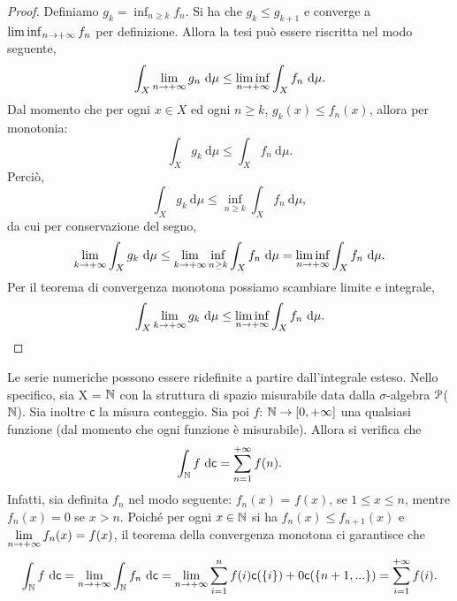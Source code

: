 \documentclass[Completo.tex]{subfiles}
\begin{document}
\begin{proof}
	Definiamo $g_k = \inf_{n \geq k} f_n$. Si ha che $g_k \leq g_{k+1}$ e converge a $\liminf_{n \rightarrow +\infty} f_n$ per definizione. Allora la tesi può essere riscritta nel modo seguente,
	\begin{equation*}
	\int_X \lim_{n \ra +\infty} g_n \ \mathrm{d}\mu \leq \liminf_{n \ra +\infty} \int_X f_n \ \mathrm{d}\mu.
	\end{equation*}
	Dal momento che per ogni $x \in X$ ed ogni $n \geq k$, $g_k(x) \leq f_n(x)$, allora per monotonia:
	\begin{equation*}
	\int_X g_k \ \mathrm{d}\mu \leq \int_X f_n \ \mathrm{d}\mu.
	\end{equation*}
	Perciò,
	\begin{equation*}
	\int_X g_k \ \mathrm{d}\mu \leq \inf_{n \geq k} \int_X f_n \ \mathrm{d}\mu,
	\end{equation*}
	da cui per conservazione del segno,
	\begin{equation*}
	\lim_{k \rightarrow +\infty} \int_X g_k \ \mathrm{d}\mu \leq \lim_{k \rightarrow +\infty} \inf_{n \geq k} \int_X f_n \ \mathrm{d}\mu = \liminf_{n \rightarrow +\infty} \int_X f_n \ \mathrm{d}\mu.
	\end{equation*}
	Per il teorema di convergenza monotona possiamo scambiare limite e integrale,
	\begin{equation*}
	\int_X \lim_{k \rightarrow +\infty} g_k \ \mathrm{d}\mu \leq \liminf_{n \rightarrow +\infty} \int_X f_n \ \mathrm{d}\mu.
	\end{equation*}
\end{proof}
Le serie numeriche possono essere ridefinite a partire dall'integrale esteso. Nello specifico, sia X = $\bb[N]$ con la struttura di spazio misurabile data dalla $\sigma$-algebra $\eu[P]$($\bb[N]$). Sia inoltre $\mathsf{c}$ la misura conteggio. Sia poi $f$: $\bb[N] \ra [0, +\infty]$ una qualsiasi funzione (dal momento che ogni funzione è misurabile). Allora si verifica che
\begin{equation*}
\int_{\bb[N]} f \ \mathrm{d}\mathsf{c} = \sum_{n=1}^{+\infty} f(n).
\end{equation*}
Infatti, sia definita $f_n$ nel modo seguente: $f_n(x)$ = $f(x)$, se $1 \leq x \leq n$, mentre $f_n(x) = 0$ se $x > n$. Poiché per ogni $x \in \bb[N]$ si ha $f_n(x) \leq f_{n+1}(x)$ e $\lim\limits_{n \rightarrow +\infty}f_n(x) = f(x)$, il teorema della convergenza monotona ci garantisce che
\begin{equation*}
\int_{\bb[N]} f \ \mathrm{d}\mathsf{c} = \lim_{n \ra +\infty} \int_{\bb[N]} f_n \ \mathrm{d}\mathsf{c} = \lim_{n \ra +\infty} \sum_{i = 1}^{n} f(i) \mathsf{c}(\{i\}) + 0\mathsf{c}(\{n+1, ...\}) = \sum_{i = 1}^{+\infty} f(i).
\end{equation*}
\end{document}
